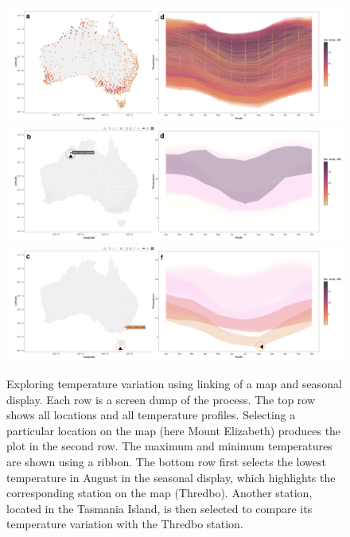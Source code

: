\documentclass[
  shortnames]{jss}
\begin{document}
\begin{CodeChunk}
\begin{figure}

{\centering \includegraphics[width=1\linewidth,height=0.23\textheight]{../figures/linking} \includegraphics[width=1\linewidth,height=0.23\textheight]{../figures/linking-north} \includegraphics[width=1\linewidth,height=0.23\textheight]{../figures/linking-lower} 

}

\caption[Exploring temperature variation using linking of a map and seasonal display]{Exploring temperature variation using linking of a map and seasonal display. Each row is a screen dump of the process. The top row shows all locations and all temperature profiles. Selecting a particular location on the map (here Mount Elizabeth) produces the plot in the second row. The maximum and minimum temperatures are shown using a ribbon. The bottom row first selects the lowest temperature in August in the seasonal display, which highlights the corresponding station on the map (Thredbo). Another  station, located in the Tasmania Island, is then selected to compare its temperature variation with the Thredbo station.}\label{fig:interactive-linking}
\end{figure}
\end{CodeChunk}
\end{document}
